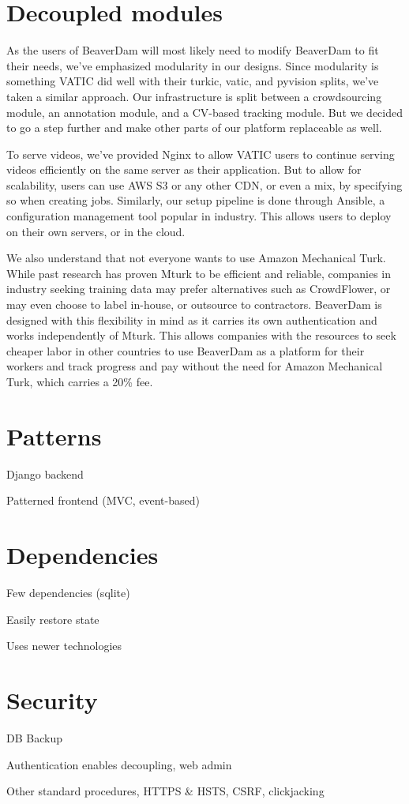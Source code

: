 \section{Decoupled modules}

As the users of BeaverDam will most likely need to modify BeaverDam to fit their needs,
we've emphasized modularity in our designs. 
Since modularity is something VATIC did well with their turkic, vatic, and pyvision splits, 
we've taken a similar approach. 
Our infrastructure is split between a crowdsourcing module, an annotation module, and a CV-based tracking module. 
But we decided to go a step further and make other parts of our platform replaceable as well.

To serve videos, we've provided Nginx to allow VATIC users to continue serving videos efficiently on the same server as their application.
But to allow for scalability, users can use AWS S3 or any other CDN, or even a mix, by specifying so when creating jobs.
Similarly, our setup pipeline is done through Ansible, a configuration management tool popular in industry. 
This allows users to deploy on their own servers, or in the cloud.

We also understand that not everyone wants to use Amazon Mechanical Turk. 
While past research has proven Mturk to be efficient and reliable, 
companies in industry seeking training data may prefer alternatives such as CrowdFlower, 
or may even choose to label in-house, or outsource to contractors.
BeaverDam is designed with this flexibility in mind as it carries its own authentication and works independently of Mturk.
This allows companies with the resources to seek cheaper labor in other countries to use BeaverDam as a platform for their workers
and track progress and pay without the need for Amazon Mechanical Turk, which carries a 20\% fee. 

\section{Patterns}

Django backend

Patterned frontend (MVC, event-based)

\section{Dependencies}

Few dependencies (sqlite)

Easily restore state

Uses newer technologies

\section{Security}

DB Backup

Authentication enables decoupling, web admin

Other standard procedures, HTTPS \& HSTS, CSRF, clickjacking


